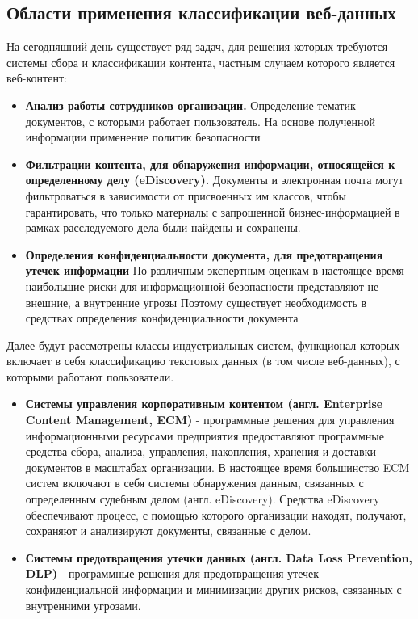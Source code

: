 \documentclass[russian, utf8, emptystyle]{eskdtext}
\begin{document}
\subsection {Области применения классификации веб-данных}
На сегодняшний день существует ряд задач, для решения которых требуются системы сбора и классификации контента, частным случаем которого является веб-контент:
\begin{itemize}
	\item {\bf Анализ работы сотрудников организации.}
	Определение тематик документов, с которыми работает пользователь. На основе полученной информации применение политик безопасности
	\item {\bf Фильтрации контента, для обнаружения информации, относящейся к определенному делу (eDiscovery\cite{eDiscovery}).}
	Документы и электронная почта могут фильтроваться в зависимости от присвоенных им классов, чтобы гарантировать, что только материалы с запрошенной бизнес-информацией в рамках расследуемого дела были найдены и сохранены.
	\item {\bf Определения конфиденциальности документа, для предотвращения утечек информации}
	По различным экспертным оценкам в настоящее время наибольшие риски для информационной безопасности представляют не внешние, а внутренние угрозы \cite{InfoWatch}
	Поэтому существует необходимость в средствах определения конфиденциальности документа
	
\end{itemize}

Далее будут рассмотрены классы индустриальных систем, функционал которых включает в себя классификацию текстовых данных (в том числе веб-данных), с которыми работают пользователи.
\begin{itemize}
	\item {\bf 	Системы управления корпоративным контентом (англ. Enterprise Content Management, ECM) } - программные решения для управления информационными ресурсами предприятия предоставляют программные средства сбора, анализа, управления, накопления, хранения и доставки документов в масштабах организации. В настоящее время большинство ECM систем включают в себя системы обнаружения данным, связанных с определенным судебным делом (англ. eDiscovery). Средства eDiscovery обеспечивают процесс, с помощью которого организации находят, получают, сохраняют и анализируют документы, связанные с делом.
	\item {\bf Системы предотвращения утечки данных (англ. Data Loss Prevention, DLP)} -
	программные решения для предотвращения утечек конфиденциальной информации и минимизации других рисков, связанных с внутренними угрозами.
\end{itemize}
\end{document}
